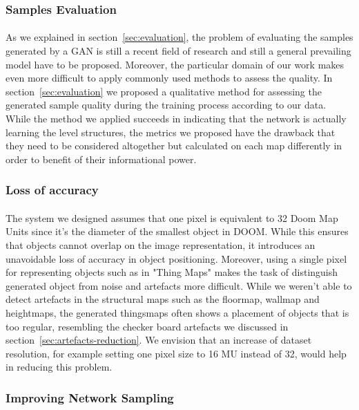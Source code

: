 \subsubsection{Samples Evaluation}
\paragraph{} As we explained in section~\ref{sec:evaluation}, the problem of evaluating the samples generated by a GAN is still a recent field of research and still a general prevailing model have to be proposed. Moreover, the particular domain of our work makes even more difficult to apply commonly used methods to assess the quality. In section~\ref{sec:evaluation} we proposed a qualitative method for assessing the generated sample quality during the training process according to our data. While the method we applied succeeds in indicating that the network is actually learning the level structures, the metrics we proposed have the drawback that they need to be considered altogether but calculated on each map differently in order to benefit of their informational power.

\subsubsection{Loss of accuracy}
\paragraph{} The system we designed assumes that one pixel is equivalent to 32 Doom Map Units since it's the diameter of the smallest object in DOOM. While this ensures that objects cannot overlap on the image representation, it introduces an unavoidable loss of accuracy in object positioning. Moreover, using a single pixel for representing objects such as in "Thing Maps" makes the task of distinguish generated object from noise and artefacts more difficult. While we weren't able to detect artefacts in the structural maps such as the floormap, wallmap and heightmaps, the generated \glspl{thingsmap} often shows a placement of objects that is too regular, resembling the checker board artefacts we discussed in section~\ref{sec:artefacts-reduction}. We envision that an increase of dataset resolution, for example setting one pixel size to 16 MU instead of 32, would help in reducing this problem. 

\subsubsection{Improving Network Sampling}
\label{sec:sampling}
